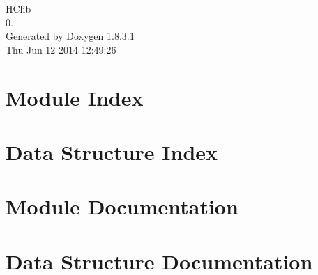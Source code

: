 \documentclass{book}
\begin{document}
\hypersetup{pageanchor=false,citecolor=blue}
\begin{titlepage}
\vspace*{7cm}
\begin{center}
{\Large H\-Clib \\[1ex]\large 0. }\\
\vspace*{1cm}
{\large Generated by Doxygen 1.8.3.1}\\
\vspace*{0.5cm}
{\small Thu Jun 12 2014 12:49:26}\\
\end{center}
\end{titlepage}
\clearemptydoublepage
{}
\tableofcontents
\clearemptydoublepage
{}
\hypersetup{pageanchor=true,citecolor=blue}
\chapter{Module Index}

\chapter{Data Structure Index}

\chapter{Module Documentation}




\chapter{Data Structure Documentation}






























\printindex
\end{document}

